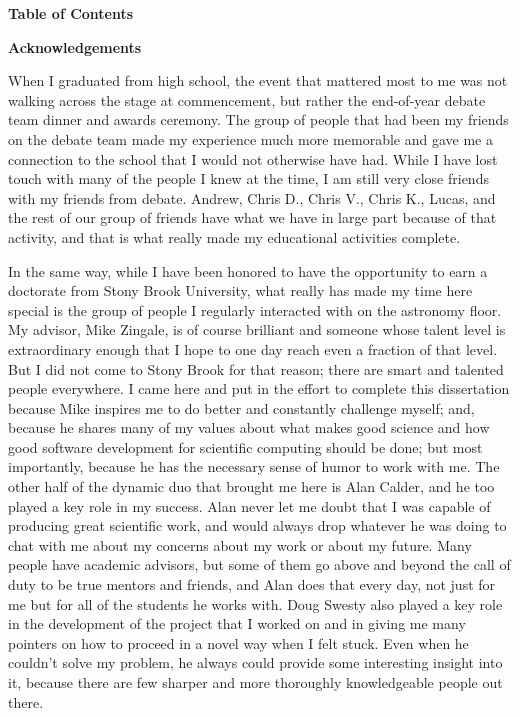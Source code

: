 \documentclass[12pt]{article}
\begin{document}
\newpage
\centerline{\bf{Table of Contents}}
\renewcommand*\contentsname{}
\tableofcontents

\newpage

\listoffigures

\listoftables



\newpage
\centerline{\bf{Acknowledgements}}
\vspace*{2\baselineskip}
When I graduated from high school, the event that mattered most to me was
not walking across the stage at commencement, but rather the end-of-year
debate team dinner and awards ceremony. The group of people that had been
my friends on the debate team made my experience much more memorable and
gave me a connection to the school that I would not otherwise have had.
While I have lost touch with many of the people I knew at the time, I am
still very close friends with my friends from debate. Andrew, Chris D.,
Chris V., Chris K., Lucas, and the rest of our group of friends have
what we have in large part because of that activity, and that is what
really made my educational activities complete.

In the same way, while I have been honored to have the opportunity to
earn a doctorate from Stony Brook University, what really has made my
time here special is the group of people I regularly interacted with
on the astronomy floor. My advisor, Mike Zingale, is of course brilliant
and someone whose talent level is extraordinary enough that I hope to
one day reach even a fraction of that level. But I did not come to Stony
Brook for that reason; there are smart and talented people everywhere.
I came here and put in the effort to complete this dissertation because
Mike inspires me to do better and constantly challenge myself;
and, because he shares many of my values about what makes good science and
how good software development for scientific computing should be done;
but most importantly, because he has the necessary sense of humor to work
with me. The other half of the dynamic duo that brought me here is Alan
Calder, and he too played a key role in my success. Alan never let me
doubt that I was capable of producing great scientific work, and would
always drop whatever he was doing to chat with me about my concerns about
my work or about my future. Many people have academic advisors, but some
of them go above and beyond the call of duty to be true mentors and friends,
and Alan does that every day, not just for me but for all of the students
he works with. Doug Swesty also played a key role in the development of the
project that I worked on and in giving me many pointers on how to proceed
in a novel way when I felt stuck. Even when he couldn't solve my problem,
he always could provide some interesting insight into it, because there
are few sharper and more thoroughly knowledgeable people out there.
\end{document}
